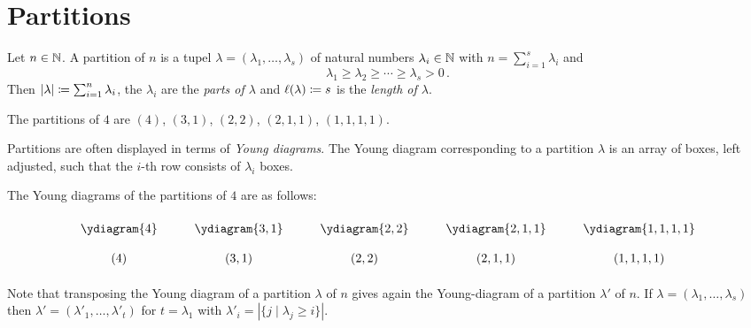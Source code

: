 \section{Partitions}


\begin{definition}
  Let $n \in \mathbb{N}$.
  A partition of $n$ is a tupel $\lambda = (\lambda_1, \dotsc, \lambda_s)$ of natural numbers $\lambda_i \in \mathbb{N}$ with $n = \sum_{i=1}^s \lambda_i$ and
  \[
          \lambda_1
    \geq  \lambda_2
    \geq  \dotsb
    \geq  \lambda_s
    >  0 \,.
  \]
  Then $|\lambda| \coloneqq \sum_{i=1}^n \lambda_i$, the $\lambda_i$ are the \emph{parts of $\lambda$} and $\ell(\lambda) \coloneqq s$ is the \emph{length of $\lambda$}.
\end{definition}


\begin{example}
  The partitions of $4$ are $(4)$, $(3,1)$, $(2,2)$, $(2,1,1)$, $(1,1,1,1)$.
\end{example}


\begin{fluff}
  Partitions are often displayed in terms of \emph{Young diagrams}.
  The Young diagram corresponding to a partition $\lambda$ is an array of boxes, left adjusted, such that the $i$-th row consists of $\lambda_i$ boxes.
\end{fluff}


\begin{example}
  The Young diagrams of the partitions of $4$ are as follows:
  \[
    \renewcommand{\arraystretch}{2}
    \begin{matrix}
        \ydiagram{4}
      & \quad
      & \ydiagram{3,1}
      & \quad
      & \ydiagram{2,2}
      & \quad
      & \ydiagram{2,1,1}
      & \quad
      & \ydiagram{1,1,1,1}
      \\
        (4)
      & {}
      & (3,1)
      & {}
      & (2,2)
      & {}
      & (2,1,1)
      & {}
      & (1,1,1,1)
    \end{matrix}
  \]
\end{example}


\begin{fluff}
  Note that transposing the Young diagram of a partition $\lambda$ of $n$ gives again the Young-diagram of a partition $\lambda'$ of $n$.
  If $\lambda = (\lambda_1, \dotsc, \lambda_s)$ then $\lambda' = (\lambda'_1, \dotsc, \lambda'_t)$ for $t = \lambda_1$ with $\lambda'_i = |\{j \mid \lambda_j \geq i\}|$.
\end{fluff}

